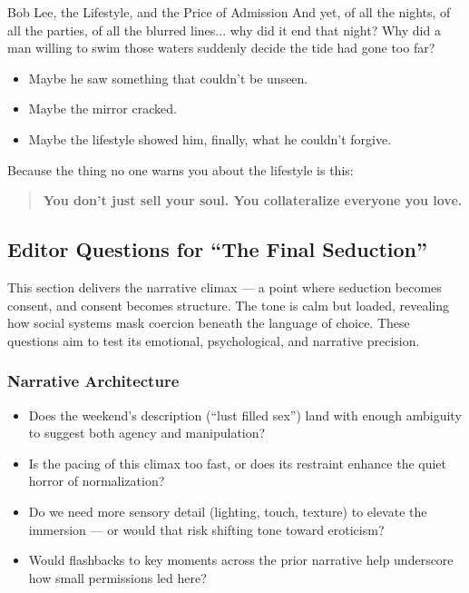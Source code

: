 \begin{HistoricalSidebar}{Bob Lee, the Lifestyle, and the Price of Admission}
  And yet, of all the nights, of all the parties, of all the blurred lines... why did it end that night?  
  Why did a man willing to swim those waters suddenly decide the tide had gone too far?

  \medskip
  
  \begin{itemize}
    \item Maybe he saw something that couldn’t be unseen.
    \item Maybe the mirror cracked.
    \item Maybe the lifestyle showed him, finally,  what he couldn’t forgive.
  \end{itemize}

  \medskip
  
  Because the thing no one warns you about the lifestyle is this: 

  \begin{quote}
    \textbf{You don’t just sell your soul.  You collateralize everyone you love.}
  \end{quote}
  
\end{HistoricalSidebar}

\medskip

\subsection*{Editor Questions for ``The Final Seduction''}

This section delivers the narrative climax — a point where seduction becomes consent, and consent becomes structure. The tone is calm but loaded, revealing how social systems mask coercion beneath the language of choice. These questions aim to test its emotional, psychological, and narrative precision.

\subsubsection*{Narrative Architecture}

\begin{itemize}
  \item Does the weekend’s description (``lust filled sex'') land with enough ambiguity to suggest both agency and manipulation?
  \item Is the pacing of this climax too fast, or does its restraint enhance the quiet horror of normalization?
  \item Do we need more sensory detail (lighting, touch, texture) to elevate the immersion — or would that risk shifting tone toward eroticism?
  \item Would flashbacks to key moments across the prior narrative help underscore how small permissions led here?
\end{itemize}

